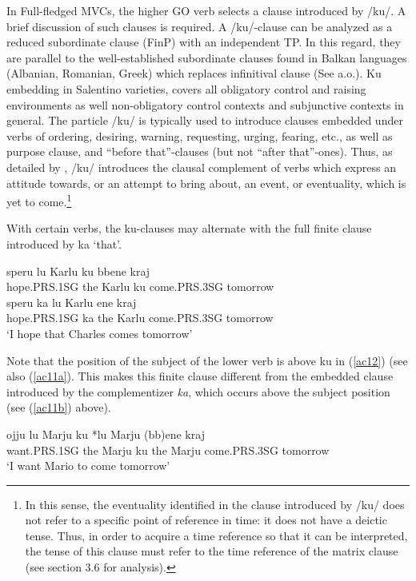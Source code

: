\documentclass[output=paper]{langscibook}
\begin{document}
In Full-fledged MVCs, the higher GO verb selects a clause introduced by /ku/.  A brief discussion of such clauses is required.  A /ku/-clause can be analyzed as a reduced subordinate clause (FinP) with an independent TP.  In this regard, they are parallel to the well-established subordinate clauses found in Balkan languages (Albanian, Romanian, Greek) which replaces infinitival clause (See \cite{calabrese1993a, rivero1994a, manzini2005a, roberts2003a} a.o.). Ku embedding in Salentino varieties, covers all obligatory control and raising environments as well non-obligatory control contexts and subjunctive contexts in general. The particle /ku/ is typically used to introduce clauses embedded under verbs of ordering, desiring, warning, requesting, urging, fearing, etc., as well as purpose clause, and “before that”-clauses (but not “after that”-ones). Thus, as detailed by \cite{calabrese1993a}, /ku/ introduces the clausal complement of verbs which express an attitude towards, or an attempt to bring about, an event, or eventuality, which is yet to come.\footnote{In this sense, the eventuality identified in the clause introduced by /ku/ does not refer to a specific point of reference in time: it does not have a deictic tense.  Thus, in order to acquire a time reference so that it can be interpreted, the tense of this clause must refer to the time reference of the matrix clause (see section 3.6 for analysis).}

With certain verbs, the ku-clauses may alternate with the full finite clause introduced by ka ‘that’. 

\ea\label{ac11}
    \ea \label{ac11a}\gll speru   lu  Karlu   ku  bbene      kraj \\
       hope.PRS.1SG    the  Karlu   ku  come.PRS.3SG  tomorrow\\
    \ex \label{ac11b}\gll speru       ka   lu  Karlu ene       kraj \\
     hope.PRS.1SG    ka   the  Karlu  come.PRS.3SG  tomorrow\\
   \glt ‘I hope that Charles comes tomorrow’
    \z
\z

Note that the position of the subject of the lower verb is above ku in (\ref{ac12}) (see also (\ref{ac11a}). This makes this finite clause different from the embedded clause introduced by the complementizer \textit{ka}, which occurs above the subject position (see (\ref{ac11b}) above). 

\ea\label{ac12}
\gll ojju   {lu Marju} ku {*lu Marju} (bb)ene  kraj \\
 want.PRS.1SG {the Marju} ku {the Marju}  come.PRS.3SG tomorrow\\
\glt ‘I want Mario to come tomorrow’
\z
\end{document}
